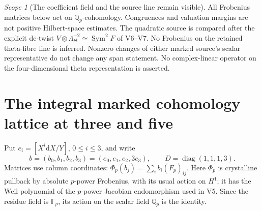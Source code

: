 \documentclass[11pt]{article}
\theoremstyle{definition}
\theoremstyle{remark}
\newtheorem{scope}[scope]{Scope}
\newcommand{\F}{\mathbb F}
\newcommand{\Q}{\mathbb Q}
\newcommand{\dd}{\mathrm d}
\begin{document}
\begin{scope}[The coefficient field and the source line remain visible]
All Frobenius matrices below act on $\Q_p$-cohomology. Congruences and
valuation margins are not positive Hilbert-space estimates. The quadratic
source is compared after the explicit de-twist
$V\otimes\Lambda_\Theta^{-2}\simeq\operatorname{Sym}^2F$ of V6--V7.
No Frobenius on the retained theta-fibre line is inferred. Nonzero changes
of either marked source's scalar representative do not change any span
statement. No complex-linear operator on the four-dimensional theta
representation is asserted.
\end{scope}

\section{The integral marked cohomology lattice at three and five}
\label{sec:v11-lattice}
Put $e_i=[X^i\dd X/Y]$, $0\le i\le3$, and write
\begin{equation}
 \boxed{b=(b_0,b_1,b_2,b_3)=(e_0,e_1,e_2,3e_3),\qquad
 D=\operatorname{diag}(1,1,1,3).}
 \label{eq:v11-basis}
\end{equation}
Matrices use column coordinates: $\Phi_p(b_j)=\sum_i b_i(F_p)_{ij}$.
Here $\Phi_p$ is crystalline pullback by absolute $p$-power Frobenius,
with its usual action on $H^1$; it has the Weil polynomial of the
$p$-power Jacobian endomorphism used in V5. Since the residue field is
$\F_p$, its action on the scalar field $\Q_p$ is the identity.
\end{document}
